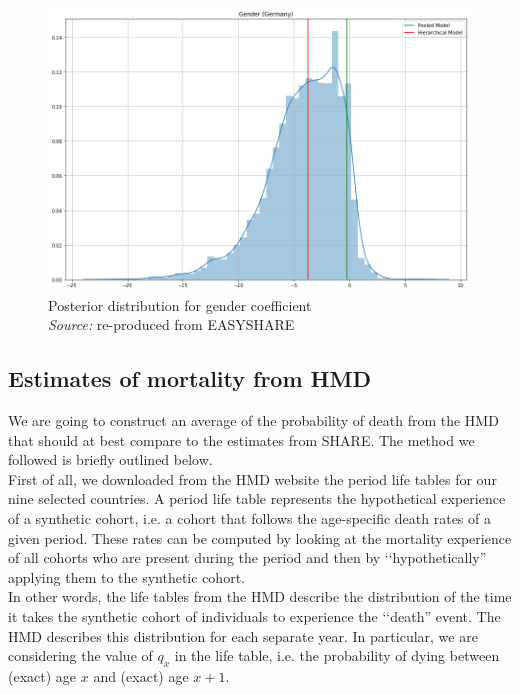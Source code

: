 \begin{figure}[H]
\centering
\includegraphics[scale=.3]{images/bayesian/download-38.png}
            \captionsetup{justification=centering}
    \caption{Posterior distribution for gender coefficient \\
    \textit{Source:} re-produced from EASYSHARE}
    \label{fig:age_distr_germany}
\end{figure}


\subsection{Estimates of mortality from HMD}\label{HMD}

We are going to construct an average of the probability of death from the HMD that should at best compare to the estimates from SHARE. The method we followed is briefly outlined below.\\

First of all, we downloaded from the HMD website the period life tables for our nine selected countries. A period life table represents the hypothetical experience of a synthetic cohort, i.e. a cohort that follows the age-specific death rates of a given period. These rates can be computed by looking at the mortality experience of all cohorts who are present during the period and then by \lq\lq hypothetically'' applying them to the synthetic cohort.\\
In other words, the life tables from the HMD describe the distribution of the time it takes the synthetic cohort of individuals to experience the \lq\lq death'' event. The HMD describes this distribution for each separate year. In particular, we are considering the value of
$q_x$ in the life table, i.e. the probability of dying between (exact) age $x$ and (exact) age $x+1$. \\

